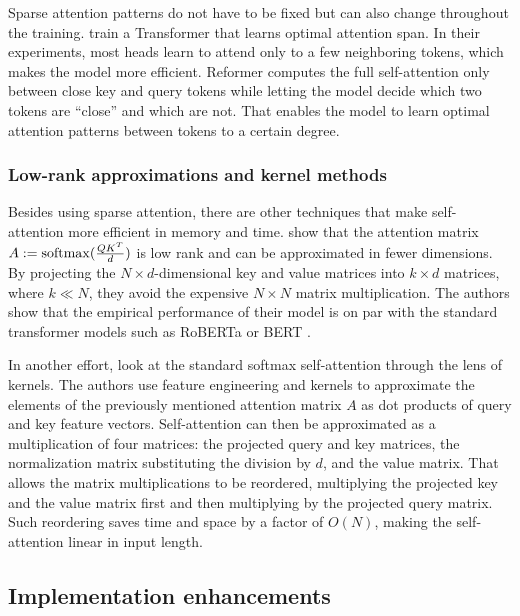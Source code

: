 Sparse attention patterns do not have to be fixed but can also change
throughout the training. \cite{sukhbaatar2019adaptive} train a Transformer that
learns optimal attention span. In their experiments, most heads learn to attend
only to a few neighboring tokens, which makes the model more efficient.
Reformer \citep{kitaev2020reformer} computes the full self-attention only
between close key and query tokens while letting the model decide which two
tokens are ``close'' and which are not. That enables the model to learn optimal
attention patterns between tokens to a certain degree.

\subsubsection{Low-rank approximations and kernel methods}

Besides using sparse attention, there are other techniques that make self-attention more
efficient in memory and time. \cite{wang2020linformer} show that the
attention matrix $A := \operatorname*{softmax}(\frac{QK^T}{d})$ is low rank and can be approximated in fewer dimensions. By projecting the $N \times
d$-dimensional key and value matrices into $k \times d$ matrices, where $k\ll
N$, they avoid the expensive $N\times N$ matrix multiplication. The authors show
that the empirical performance of their model is on par with the standard
transformer models such as RoBERTa \citep{liu2019roberta} or
BERT \citep{devlin2019bert}.

In another effort, \cite{choromanski2020rethinking} look at the standard
softmax self-attention through the lens of kernels. The authors use feature
engineering and kernels to approximate the elements of the previously mentioned attention
matrix $A$ as dot products of query and key feature vectors. Self-attention can
then be approximated as a multiplication of four matrices: the projected query
and key matrices, the normalization matrix substituting the division by $d$, and
the value matrix. That allows the matrix multiplications to be reordered,
multiplying the projected key and the value matrix first and then multiplying
by the projected query matrix. Such reordering saves time and space by a
factor of $O(N)$, making the self-attention linear in input length.

\subsection{Implementation enhancements}

